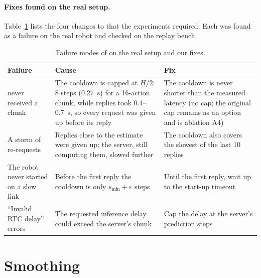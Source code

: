 \paragraph{Fixes found on the real setup.} Table~\ref{tab:fixes} lists the four changes to \drtc{} that the
experiments required. Each was found as a failure on the real robot and checked on the replay bench.

\begin{table}[htbp]
  \centering
  \small
  \begin{tabularx}{\textwidth}{>{\raggedright\arraybackslash}p{} X X}
    \toprule
    Failure & Cause & Fix \\
    \midrule
    \groot{} never received a chunk & The cooldown is capped at $H/2$: 8 steps (0.27~s) for a 16-action chunk, while
      replies took 0.4--0.7~s, so every request was given up before its reply & The cooldown is never shorter than the
      measured latency (no cap; the original cap remains as an option and is ablation A4) \\
    A storm of re-requests & Replies close to the estimate were given up; the server, still computing them, slowed
      further & The cooldown also covers the slowest of the last 10 replies \\
    The robot never started on a slow link & Before the first reply the cooldown is only $s_{\min}+\varepsilon$ steps
      & Until the first reply, wait up to the start-up timeout \\
    \enquote{Invalid RTC delay} errors & The requested inference delay could exceed the server's chunk & Cap the
      delay at the server's prediction steps \\
    \bottomrule
  \end{tabularx}
  \caption{Failure modes of \drtc{} on the real setup and our fixes.}\label{tab:fixes}
\end{table}


\section{Smoothing}\label{sec:smoothing}


